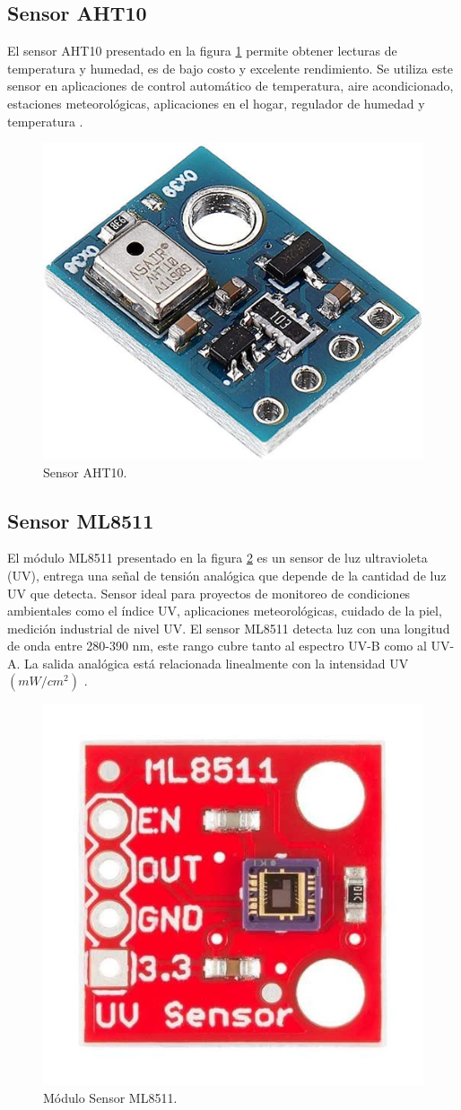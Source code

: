 \subsection{Sensor AHT10}
El sensor AHT10 presentado en la figura \ref{fig:SensorAHT10} permite obtener lecturas de temperatura y humedad, es de bajo costo y excelente rendimiento. Se utiliza este sensor en aplicaciones de control automático de temperatura, aire acondicionado, estaciones meteorológicas, aplicaciones en el hogar, regulador de humedad y temperatura \citep{ModuloAHT10}.
\begin{figure}[htbp]
	\centering
	\includegraphics[width=.3\textwidth]{./Figures/aht10.jpg}
	\caption{Sensor AHT10\protect\footnotemark.}
	\label{fig:SensorAHT10}
\end{figure}
\subsection{Sensor ML8511}
El módulo ML8511 presentado en la figura \ref{fig:SensorML8511} es un sensor de luz ultravioleta (UV), entrega una señal de tensión analógica que depende de la cantidad de luz UV que detecta. Sensor ideal para proyectos de monitoreo de condiciones ambientales como el índice UV, aplicaciones meteorológicas, cuidado de la piel, medición industrial de nivel UV.
El sensor ML8511 detecta luz con una longitud de onda entre 280-390 nm, este rango cubre tanto al espectro UV-B como al UV-A. La salida analógica está relacionada linealmente con la intensidad UV $(mW/cm^2)$ \citep{ModuloML8511}.
\begin{figure}[htbp]
	\centering
	\includegraphics[width=.3\textwidth]{./Figures/ml8511.jpg}
	\caption[Módulo Sensor ML8511]{Módulo Sensor ML8511. \footnotemark }
	\label{fig:SensorML8511}
\end{figure}

